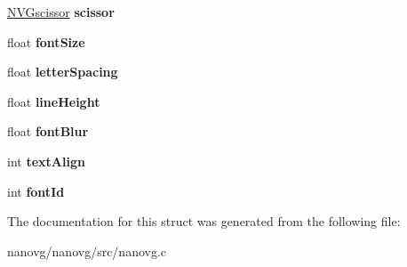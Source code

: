 \begin{DoxyCompactItemize}
\item 
\hypertarget{struct_n_v_gstate_a88f7cb0fc3d8be86d937434d7ed4c6ad}{\hyperlink{struct_n_v_gscissor}{N\+V\+Gscissor} {\bfseries scissor}}\label{struct_n_v_gstate_a88f7cb0fc3d8be86d937434d7ed4c6ad}

\item 
\hypertarget{struct_n_v_gstate_a58d3ac1b707cbe651244a7bc00a84dc2}{float {\bfseries font\+Size}}\label{struct_n_v_gstate_a58d3ac1b707cbe651244a7bc00a84dc2}

\item 
\hypertarget{struct_n_v_gstate_a4c83b231e88c9a45c3c53a1ff4022f02}{float {\bfseries letter\+Spacing}}\label{struct_n_v_gstate_a4c83b231e88c9a45c3c53a1ff4022f02}

\item 
\hypertarget{struct_n_v_gstate_a456105152dc65acf8888734de0cb6195}{float {\bfseries line\+Height}}\label{struct_n_v_gstate_a456105152dc65acf8888734de0cb6195}

\item 
\hypertarget{struct_n_v_gstate_ad282c241982571cd28296bdc42a3e167}{float {\bfseries font\+Blur}}\label{struct_n_v_gstate_ad282c241982571cd28296bdc42a3e167}

\item 
\hypertarget{struct_n_v_gstate_a892bf3be3137e966108164c93730ce2b}{int {\bfseries text\+Align}}\label{struct_n_v_gstate_a892bf3be3137e966108164c93730ce2b}

\item 
\hypertarget{struct_n_v_gstate_a714541c6c402eb466a54610696218215}{int {\bfseries font\+Id}}\label{struct_n_v_gstate_a714541c6c402eb466a54610696218215}

\end{DoxyCompactItemize}


The documentation for this struct was generated from the following file\+:\begin{DoxyCompactItemize}
\item 
nanovg/nanovg/src/nanovg.\+c\end{DoxyCompactItemize}
